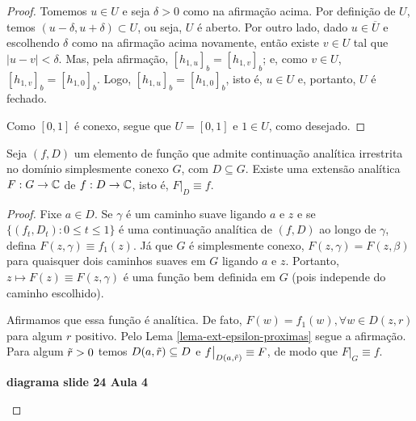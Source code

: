 \begin{proof}
        Tomemos $u\in U$ e seja $\delta > 0$ como na afirmação acima. Por definição de $U$,
        temos $(u-\delta, u+\delta) \subset U$, ou seja, $U$ é aberto. Por outro lado, dado
        $u\in\overline{U}$ e escolhendo $\delta$ como na afirmação acima novamente, então 
        existe $v\in U$ tal que $|u-v| < \delta$. Mas, pela afirmação, 
        $[h_{1,u}]_b = [h_{1,v}]_b$; e, como $v\in U$, $[h_{1,v}]_b = [h_{1,0}]_b$.
        Logo, $[h_{1,u}]_b = [h_{1,0}]_b$, isto é, $u\in U$ e, portanto, $U$ é fechado.
        
        Como $[0,1]$ é conexo, segue que $U = [0,1]$ e $1\in U$, como desejado.
    \end{proof}

    \begin{corolario}
        Seja $(f,D)$ um elemento de função que admite continuação analítica irrestrita no
        domínio simplesmente conexo $G$, com $D\subseteq G$. Existe uma extensão analítica
        $F:G\to\mathbb{C}$ de $f:D\to\mathbb{C}$, isto é, $F\big|_D \equiv f$.
    \end{corolario}

    \begin{proof}
        Fixe $a\in D$. Se $\gamma$ é um caminho suave ligando $a$ e $z$ e se 
        $\{ (f_t, D_t) : 0\leq t\leq 1 \}$ é uma continuação analítica de $(f,D)$ ao longo de
        $\gamma$, defina $F(z, \gamma) \equiv f_1(z)$. Já que $G$ é simplesmente conexo,
        $F(z, \gamma) = F(z,\beta)$ para quaisquer dois caminhos suaves em $G$ ligando $a$ e $z$.
        Portanto, $z\mapsto F(z)\equiv F(z, \gamma)$ é uma função bem definida em $G$ 
        (pois independe do caminho escolhido).
        
        Afirmamos que essa função é analítica. De fato, $F(w) = f_1(w), \forall w\in D(z,r)$
        para algum $r$ positivo. Pelo Lema \ref{lema-ext-epsilon-proximas} segue a afirmação.
        Para algum $\Tilde{r}>0$ temos $D(a, \Tilde{r}) \subseteq D$ e 
        $f\big|_{D(a, \Tilde{r})} \equiv F$, de modo que $F\big|_G \equiv f$.
        \begin{center}
            \textbf{diagrama slide 24 Aula 4}
        \end{center}
    \end{proof}

















